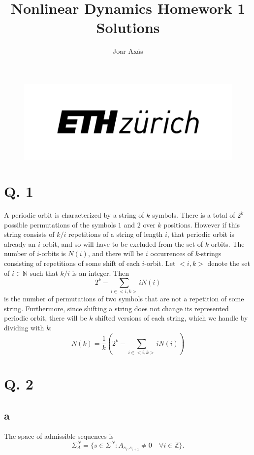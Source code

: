 \documentclass[12pt,A4]{article}
\title{Nonlinear Dynamics Homework 1 Solutions}
\author{Joar Axås}
\begin{document}
\parindent=0cm
\maketitle
\thispagestyle{empty}
\vspace{10mm}
\begin{figure}[h]
\centering
    \includegraphics[width = \linewidth]{eth.png}
\end{figure}

\newpage
\section*{Q. 1}
A periodic orbit is characterized by a string of $k$ symbols. There is a total of $2^k$ possible permutations of the symbols $1$ and $2$ over $k$ positions. However if this string consists of $k/i$ repetitions of a string of length $i$, that periodic orbit is already an $i$-orbit, and so will have to be excluded from the set of $k$-orbits. The number of $i$-orbits is $N(i)$, and there will be $i$ occurrences of $k$-strings consisting of repetitions of some shift of each $i$-orbit. Let $<i,k>$ denote the set of $i \in \mathbb{N}$ such that $k/i$ is an integer. Then 
\begin{equation}
    2^k - \sum_{i \in <i,k>} i N(i)
\end{equation}
is the number of permutations of two symbols that are not a repetition of some string. Furthermore, since shifting a string does not change its represented periodic orbit, there will be $k$ shifted versions of each string, which we handle by dividing with $k$:
\begin{equation}
    N(k) = \frac{1}{k}\left(2^k - \sum_{i \in <i,k>} i N(i) \right)
\end{equation}

\clearpage
\section*{Q. 2}
\subsection*{a}
The space of admissible sequences is
\begin{equation}
    \Sigma_A^N = \{ s\in \Sigma^N : A_{s_i, s_{i+1}} \ne 0 \quad \forall i \in \mathbb{Z} \}.
\end{equation}
\end{document}
